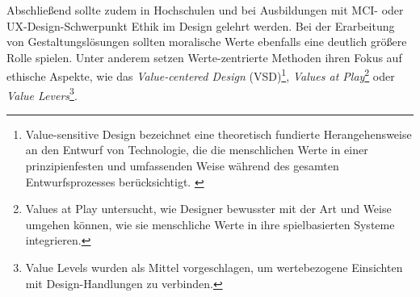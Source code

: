 \documentclass[a4paper]{article}
\begin{document}
Abschließend sollte zudem in Hochschulen und bei Ausbildungen mit MCI- oder UX-Design-Schwerpunkt Ethik im Design gelehrt werden. Bei der Erarbeitung von Gestaltungslösungen sollten moralische Werte ebenfalls eine deutlich größere Rolle spielen. Unter anderem setzen Werte-zentrierte Methoden ihren Fokus auf ethische Aspekte, wie das \textit{Value-centered Design} (VSD)\footnote{\label{foot:13}Value-sensitive Design bezeichnet eine theoretisch fundierte Herangehensweise an den Entwurf von Technologie, die die menschlichen Werte in einer prinzipienfesten und umfassenden Weise während des gesamten Entwurfsprozesses berücksichtigt. \cite{gray}}, \textit{Values at Play}\footnote{\label{foot:14}Values at Play untersucht, wie Designer bewusster mit der Art und Weise umgehen können, wie sie menschliche Werte in ihre spielbasierten Systeme integrieren.} oder \textit{Value Levers}\footnote{\label{foot:15}Value Levels wurden als Mittel vorgeschlagen, um wertebezogene Einsichten mit Design-Handlungen zu verbinden.}.   


\newpage


\printbibliography

%

%
\end{document}
